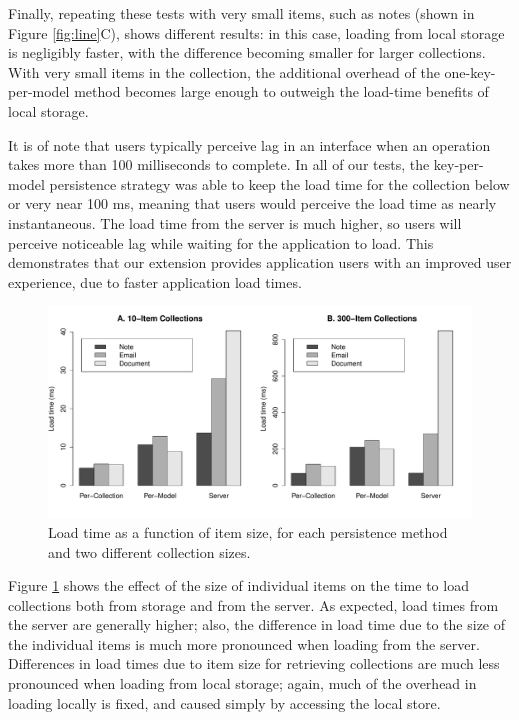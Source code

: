 \documentclass[12pt]{article}
\begin{document}
Finally, repeating these tests with very small items, such as notes (shown in
Figure \ref{fig:line}C), shows different results: in this case, loading from
local storage is negligibly faster, with the difference becoming smaller for
larger collections. With very small items in the collection, the additional
overhead of the one-key-per-model method becomes large enough to outweigh the
load-time benefits of local storage.

It is of note that users typically perceive lag in an interface when an
operation takes more than 100 milliseconds to complete. In all of our tests,
the key-per-model persistence strategy was able to keep the load time for the
collection below or very near 100 ms, meaning that users would perceive the
load time as nearly instantaneous. The load time from the server is much
higher, so users will perceive noticeable lag while waiting for the application
to load. This demonstrates that our extension provides application users with
an improved user experience, due to faster application load times.

\begin{figure}[th]
  \centering
  \includegraphics[width=\textwidth]{bars.pdf}
  \caption{Load time as a function of item size, for each persistence method
  and two different collection sizes.}
  \label{fig:bar}
\end{figure}

Figure \ref{fig:bar} shows the effect of the size of individual items on the
time to load collections both from storage and from the server. As expected,
load times from the server are generally higher; also, the difference in load
time due to the size of the individual items is much more pronounced when
loading from the server. Differences in load times due to item size for
retrieving collections are much less pronounced when loading from local
storage; again, much of the overhead in loading locally is fixed, and caused
simply by accessing the local store.
\end{document}
